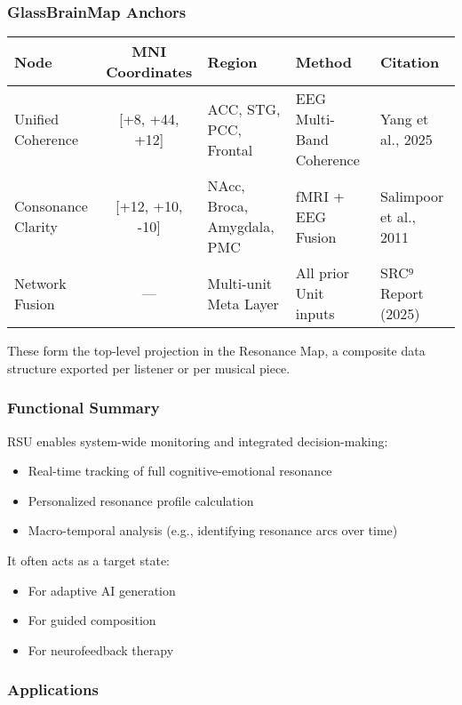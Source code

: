 \subsubsection*{GlassBrainMap Anchors}

\begin{center}
\begin{tabular}{|l|c|l|l|l|}
\hline
\textbf{Node} & \textbf{MNI Coordinates} & \textbf{Region} & \textbf{Method} & \textbf{Citation} \\
\hline
Unified Coherence & [+8, +44, +12] & ACC, STG, PCC, Frontal & EEG Multi-Band Coherence & Yang et al., 2025 \\
Consonance Clarity & [+12, +10, -10] & NAcc, Broca, Amygdala, PMC & fMRI + EEG Fusion & Salimpoor et al., 2011 \\
Network Fusion & — & Multi-unit Meta Layer & All prior Unit inputs & SRC⁹ Report (2025) \\
\hline
\end{tabular}
\end{center}

These form the top-level projection in the Resonance Map, a composite data structure exported per listener or per musical piece.

\subsubsection*{Functional Summary}

RSU enables system-wide monitoring and integrated decision-making:

\begin{itemize}
    \item Real-time tracking of full cognitive-emotional resonance
    \item Personalized resonance profile calculation
    \item Macro-temporal analysis (e.g., identifying resonance arcs over time)
\end{itemize}

It often acts as a target state:

\begin{itemize}
    \item For adaptive AI generation
    \item For guided composition
    \item For neurofeedback therapy
\end{itemize}

\subsubsection*{Applications}

